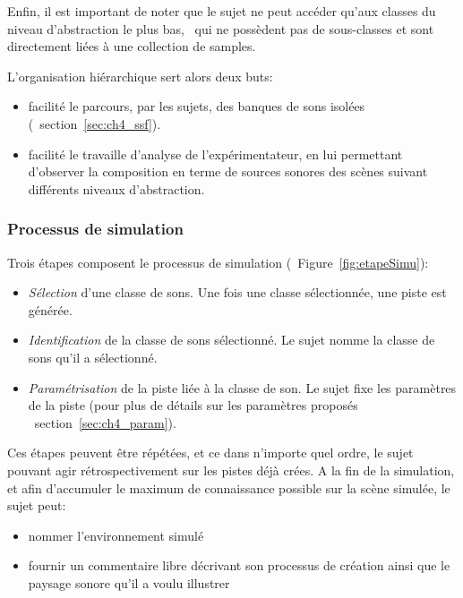 Enfin, il est important de noter que le sujet ne peut accéder qu'aux classes du niveau d'abstraction le plus bas, \ie~qui ne possèdent pas de sous-classes et sont directement liées à une collection de samples.

L’organisation hiérarchique sert alors deux buts:

\begin{itemize}
\item facilité le parcours, par les sujets, des banques de sons isolées (\cf~section~\ref{sec:ch4_ssf}).
\item facilité le travaille d'analyse de l'expérimentateur, en lui permettant d'observer la composition en terme de sources sonores des scènes suivant différents niveaux d'abstraction.
\end{itemize}

\subsubsection{Processus de simulation}

Trois étapes composent le processus de simulation (\cf~Figure~\ref{fig:etapeSimu}):

\begin{itemize}
\item \emph{Sélection} d'une classe de sons. Une fois une classe sélectionnée, une piste est générée. 
\item \emph{Identification} de la classe de sons sélectionné. Le sujet nomme la classe de sons qu'il a sélectionné.
\item \emph{Paramétrisation} de la piste liée à la classe de son. Le sujet fixe les paramètres de la piste (pour plus de détails sur les paramètres proposés \cf~section~\ref{sec:ch4_param}).
\end{itemize}

Ces étapes peuvent être répétées, et ce dans n'importe quel ordre, le sujet pouvant agir rétrospectivement sur les pistes déjà crées. A la fin de la simulation, et afin d'accumuler le maximum de connaissance possible sur la scène simulée, le sujet peut: 

\begin{itemize}
\item nommer l'environnement simulé
\item fournir un commentaire libre décrivant son processus de création ainsi que le paysage sonore qu'il a voulu illustrer
\end{itemize}

